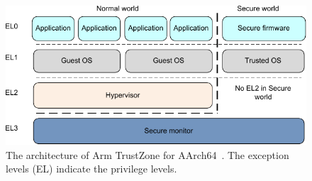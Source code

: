 \begin{figure}[htpb]
  \centering
  \includegraphics[width=0.8\linewidth]{figures/arm-trustzone-arch.pdf}
  \caption{The architecture of Arm TrustZone for AArch64~\cite{TZArch}. The exception levels (EL) indicate the privilege levels.}\label{fig:arm_trustzone_arch}
\end{figure}
